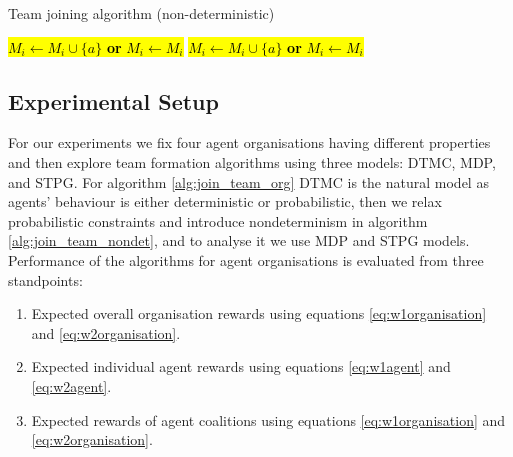 \documentclass{llncs}
\begin{document}
\begin{algorithm}[H]
\caption{Team joining algorithm (non-deterministic)}
\label{alg:join_team_nondet}
\begin{scriptsize}
\begin{algorithmic}
     
       
	 
	    \State \hl{$M_i \leftarrow M_i \cup \{a\}$  \textbf{or} $M_i \leftarrow M_i$} 
	\EndIf
       
	 
	  \State \hl{$M_i \leftarrow M_i \cup \{a\}$ \textbf{or} $M_i \leftarrow M_i$} 
	\EndIf
      \EndIf
    \EndIf
  \EndFor
\EndProcedure
\end{algorithmic}
\end{scriptsize}
\end{algorithm}

\subsection{Experimental Setup}

For our experiments we fix four agent organisations having different properties and then explore team formation algorithms using three models: DTMC, MDP, and STPG. For algorithm \ref{alg:join_team_org} DTMC is the natural model as agents' behaviour is either deterministic or probabilistic, then we relax probabilistic constraints and introduce nondeterminism in algorithm \ref{alg:join_team_nondet}, and to analyse it we use MDP and STPG models. Performance of the algorithms for agent organisations is evaluated from three standpoints:
\begin{enumerate}
 \item Expected overall organisation rewards using equations \ref{eq:w1organisation} and \ref{eq:w2organisation}.
 \item Expected individual agent rewards using equations \ref{eq:w1agent} and \ref{eq:w2agent}.
 \item Expected rewards of agent coalitions using equations \ref{eq:w1organisation} and \ref{eq:w2organisation}.
\end{enumerate}
\end{document}
